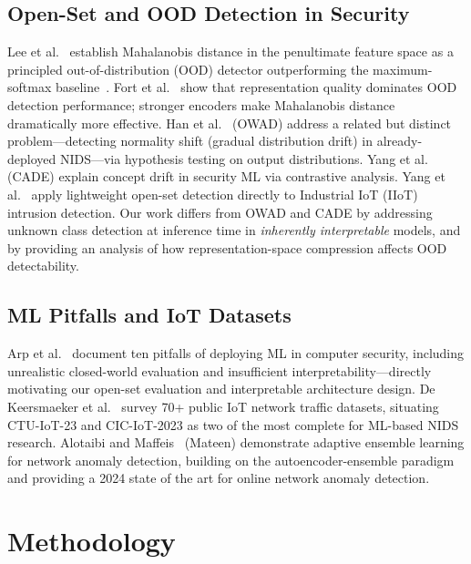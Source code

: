 \documentclass[conference]{IEEEtran}
\begin{document}
\subsection{Open-Set and OOD Detection in Security}

Lee et al.~\cite{lee2018simple} establish Mahalanobis distance in the
penultimate feature space as a principled out-of-distribution (OOD)
detector outperforming the maximum-softmax baseline~\cite{hendrycks2017baseline}.
Fort et al.~\cite{fort2021exploring} show that representation quality
dominates OOD detection performance; stronger encoders make Mahalanobis
distance dramatically more effective.
Han et al.~\cite{han2023owad} (OWAD) address a related but distinct
problem---detecting normality shift (gradual distribution drift) in
already-deployed NIDS---via hypothesis testing on output distributions.
Yang et al.~\cite{yang2021cade} (CADE) explain concept drift in security
ML via contrastive analysis.
Yang et al.~\cite{yang2025openset} apply lightweight open-set detection
directly to Industrial IoT (IIoT) intrusion detection.
Our work differs from OWAD and CADE by addressing unknown class detection
at inference time in \emph{inherently interpretable} models, and by
providing an analysis of how representation-space compression affects
OOD detectability.

\subsection{ML Pitfalls and IoT Datasets}

Arp et al.~\cite{arp2022dos} document ten pitfalls of deploying ML in
computer security, including unrealistic closed-world evaluation and
insufficient interpretability---directly motivating our open-set evaluation
and interpretable architecture design.
De Keersmaeker et al.~\cite{dekeersmaeker2023survey} survey 70+ public IoT
network traffic datasets, situating CTU-IoT-23 and CIC-IoT-2023 as two of
the most complete for ML-based NIDS research.
Alotaibi and Maffeis~\cite{alotaibi2024mateen} (Mateen) demonstrate
adaptive ensemble learning for network anomaly detection, building on the
autoencoder-ensemble paradigm and providing a 2024 state of the art for
online network anomaly detection.

\section{Methodology}
\end{document}
